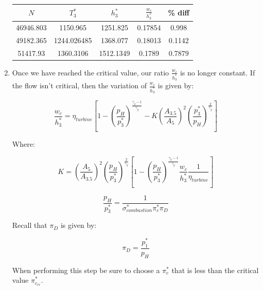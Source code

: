 \documentclass[titlepage]{article}
\begin{document}
\begin{enumerate}
    \begin{center}
      \begin{tabular}{|c|c|c|c|c|}
        \hline
        $N$ & $T_{3}^{*}$ & $h_{3}^{*}$ & $\frac{w_{c}}{h_{3}^{*}}$ & \% diff \\
        \hline
        46946.803 & 1150.965 & 1251.825 & 0.17854 & 0.998 \\
        \hline
        49182.365 & 1244.026485 & 1368.077 &	0.18013	& 0.1142 \\
        \hline
        51417.93 & 1360.3106 & 1512.1349	& 0.1789	& 0.7879 \\
        \hline
      \end{tabular}
    \end{center}
  
  
    \item Once we have reached the critical value, our ratio $\frac{w_{c}}{h_{3}^{*}}$ is no longer constant. If the flow isn't critical,
    then the variation of $\frac{w_{c}}{h_{3}^{*}}$ is given by:
  
    \begin{equation}
      \frac{w_{c}}{h_{3}^{*}} = \eta_{turbine} \left[ 1 - \left(\frac{p_{H}}{p_{3}^{*}}\right)^{\frac{\gamma_{g}-1}{\gamma_{g}}} - K \left(\frac{A_{3.5}}{A_{5}}\right)^{2} \left(\frac{p_{3}^{*}}{p_{H}}\right)^{\frac{2}{\gamma_{g}}} \right] 
    \end{equation}
    
    Where:
  
    \begin{equation}
      K = \left(\frac{A_{5}}{A_{3.5}}\right)^{2} \left(\frac{p_{H}}{p_{3}^{*}}\right)^{\frac{2}{\gamma_{g}}}\left[1 - \left(\frac{p_{H}}{p_{3}^{*}}\right)^{\frac{\gamma_{g}-1}{\gamma_{g}}} \frac{w_{c}}{h_{3}^{*}} \frac{1}{\eta_{turbine}}\right] 
    \end{equation}
  
    \begin{equation}
      \frac{p_{H}}{p_{3}^{*}} = \frac{1}{\sigma_{combustion}^{*} \pi_{c}^{*} \pi_{D}}
    \end{equation}
  
    Recall that $\pi_{D}$ is given by:
  
    \begin{equation}
      \pi_{D} = \frac{p_{1}^{*}}{p_{H}}
    \end{equation}
  
    When performing this step be sure to choose a $\pi_{c}^{*}$ that is less than the critical value $\pi_{c_{cr}}^{*}$.
  

\end{enumerate}
\end{document}
